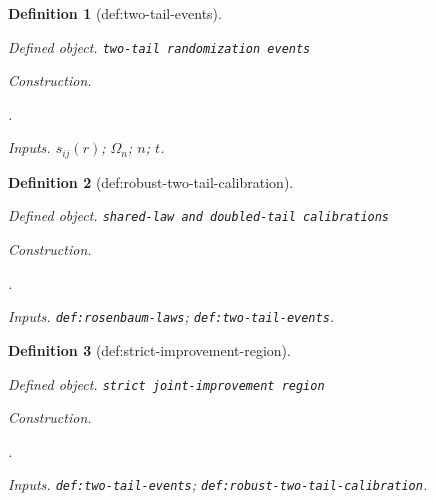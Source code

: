 \documentclass{article}
\newtheorem{definition}{Definition}
\begin{document}
\begin{definition}[def:two-tail-events]\label{def:two-tail-events}
\par\smallskip\noindent\emph{Defined object.} \texttt{two-\allowbreak{}tail randomization events}
\par\smallskip\noindent\emph{Construction.} \par\noindent {}\par\noindent.
\par\smallskip\noindent\emph{Inputs.} \(s_{ij}(r)\); \(\Omega_n\); \(n\); \(t\).
\end{definition}

\begin{definition}[def:robust-two-tail-calibration]\label{def:robust-two-tail-calibration}
\par\smallskip\noindent\emph{Defined object.} \texttt{shared-\allowbreak{}law and doubled-\allowbreak{}tail calibrations}
\par\smallskip\noindent\emph{Construction.} \par\noindent {}\par\noindent.
\par\smallskip\noindent\emph{Inputs.} \texttt{def:\allowbreak{}rosenbaum-\allowbreak{}laws}; \texttt{def:\allowbreak{}two-\allowbreak{}tail-\allowbreak{}events}.
\end{definition}

\begin{definition}[def:strict-improvement-region]\label{def:strict-improvement-region}
\par\smallskip\noindent\emph{Defined object.} \texttt{strict joint-\allowbreak{}improvement region}
\par\smallskip\noindent\emph{Construction.} \par\noindent {}\par\noindent.
\par\smallskip\noindent\emph{Inputs.} \texttt{def:\allowbreak{}two-\allowbreak{}tail-\allowbreak{}events}; \texttt{def:\allowbreak{}robust-\allowbreak{}two-\allowbreak{}tail-\allowbreak{}calibration}.
\end{definition}
\end{document}
